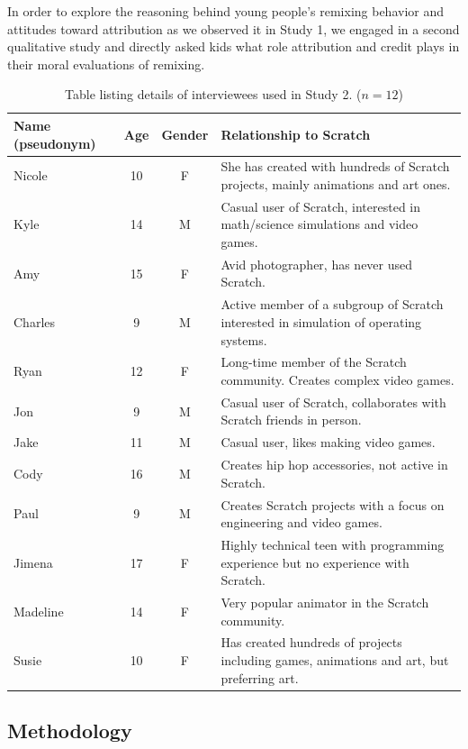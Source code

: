 In order to explore the reasoning behind young people's remixing
behavior and attitudes toward attribution as we observed it in Study
1, we engaged in a second qualitative study and directly asked kids
what role attribution and credit plays in their moral evaluations of
remixing.

\begin{table} \begin{tabular}{lccp{4.5in}} \hline
\textbf{Name (pseudonym)} & \textbf{Age} & \textbf{Gender} & \textbf{Relationship to Scratch}\\
\hline
Nicole & 10 & F & She has created with hundreds of Scratch projects, mainly animations and art ones. \\
Kyle & 14 & M & Casual user of Scratch, interested in math/science simulations and video games. \\
Amy & 15 & F & Avid photographer, has never used Scratch. \\
Charles & 9 & M & Active member of a subgroup of Scratch interested in simulation of operating systems.  \\
Ryan & 12 & F & Long-time member of the Scratch community. Creates complex video games. \\
Jon & 9 & M & Casual user of Scratch, collaborates with Scratch friends in person. \\
Jake & 11 & M & Casual user, likes making video games. \\
Cody & 16 & M & Creates hip hop accessories, not active in Scratch. \\
Paul & 9 & M & Creates Scratch projects with a focus on engineering and video games. \\
Jimena & 17 & F & Highly technical teen with programming experience but no experience with Scratch. \\
Madeline & 14 & F & Very popular animator  in the Scratch community. \\
Susie & 10 & F & Has created hundreds of projects including games, animations and art, but preferring art. \\
\hline
\end{tabular} \caption{Table listing details of interviewees used in Study 2. ($n=12$)} \label{tab:ints} \end{table}

\subsection{Methodology}

